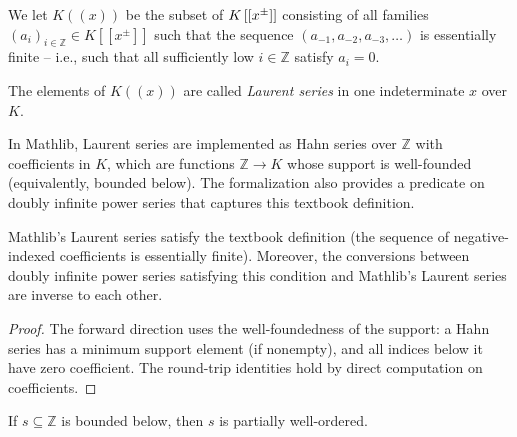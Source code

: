 \begin{definition}
\label{def.fps.laure.lauser}
\leantarget
\leanok
We let $K\left(  \left(  x\right)  \right)  $ be
the subset of $K\left[  \left[  x^{\pm}\right]  \right]  $ consisting of all
families $\left(  a_{i}\right)  _{i\in\mathbb{Z}}\in K\left[  \left[  x^{\pm
}\right]  \right]  $ such that the sequence $\left(  a_{-1},a_{-2}%
,a_{-3},\ldots\right)  $ is essentially finite -- i.e., such that all
sufficiently low $i\in\mathbb{Z}$ satisfy $a_{i}=0$.

The elements of $K\left(  \left(  x\right)  \right)  $ are called
\emph{Laurent series} in one indeterminate $x$ over $K$.

In Mathlib, Laurent series are implemented as Hahn series
over $\mathbb{Z}$ with coefficients in $K$,
which are functions $\mathbb{Z} \to K$ whose support is well-founded
(equivalently, bounded below). The formalization also provides
a predicate on doubly infinite power series that captures
this textbook definition.
\end{definition}

\begin{lemma}
\label{lem.fps.laure.mathlib-agrees}
\leanhelper
\leanok
Mathlib's Laurent series satisfy the textbook definition
(the sequence of negative-indexed coefficients is essentially finite).
Moreover, the conversions between doubly infinite power series
satisfying this condition and Mathlib's Laurent series
are inverse to each other.
\end{lemma}

\begin{proof}
\leanok
The forward direction uses the well-foundedness of the support:
a Hahn series has a minimum support element (if nonempty), and all
indices below it have zero coefficient.
The round-trip identities hold by direct computation on coefficients.
\end{proof}

\begin{lemma}
\label{lem.fps.laure.isPWO-bddBelow}
\leanhelper
\leanok
If $s \subseteq \mathbb{Z}$ is bounded below, then $s$ is partially
well-ordered.
\end{lemma}

